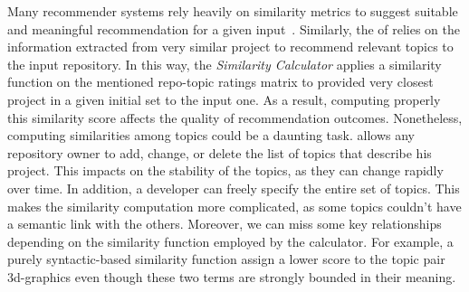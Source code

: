 %
%


Many recommender systems rely heavily on similarity metrics to suggest suitable
and meaningful recommendation for a given input~\cite{Schafer:2007:CFR:1768197.1768208,Sarwar:2001:ICF:371920.372071,NGUYEN2020110460}. 
Similarly, the  of \TF relies on the information extracted from very similar project to recommend relevant topics to the input repository. 
In this way, the \emph{Similarity Calculator} applies a similarity function on the mentioned repo-topic ratings matrix to provided very closest project in a given initial set to the input one. 
As a result, computing properly this similarity score affects the quality of recommendation outcomes.
Nonetheless, computing similarities among topics could be a daunting task. 
\GH allows any repository owner to add, change, or delete the list of topics that describe his project. This impacts on the stability of the topics, as they can change rapidly over time. In addition, a developer can freely specify the entire set of topics. This makes the similarity computation more complicated, as some topics couldn't have a semantic link with the others. Moreover, we can miss some key relationships depending on the similarity function employed by the calculator. For example, a purely syntactic-based similarity function assign a lower score to the topic pair 3d-graphics even though these two terms are strongly bounded in their meaning.

